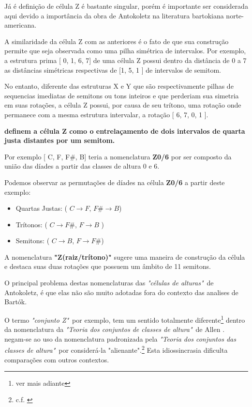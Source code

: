 \documentclass[
	12pt,				%
	openright,			%
	twoside,			%
	a4paper,			%
	english,			%
	french,				%
	spanish,			%
	brazil				%
	]{abntex2}
\begin{document}
Já é definição de célula Z é bastante singular, porém é importante ser considerada aqui devido a importância da obra de Antokoletz na literatura bartokiana norte-americana. 

A similaridade da célula Z com as anteriores é o fato de que sua construção permite que seja observada como uma pilha simétrica de intervalos. Por exemplo, a estrutura prima [ 0, 1, 6, 7] de uma célula Z possui dentro da distância de 0 a 7 as distâncias simétricas respectivas de [1, 5, 1 ] de intervalos de semitom. 

No entanto, diferente das estruturas X e Y que são respectivamente pilhas de sequencias imediatas de semitons ou tons inteiros e que perderiam sua simetria em suas rotações, a célula Z possui, por causa de seu trítono, uma rotação onde permanece com a mesma estrutura intervalar, a rotação [ 6, 7, 0, 1 ]. 

 \textbf{definem a célula Z como o entrelaçamento de dois intervalos de quarta justa distantes por um semitom.} 

Por exemplo [ C, F, F\#, B] teria a nomenclatura \textbf{Z0/6} por ser composto da união das díades a partir das classes de altura 0 e 6. 

Podemos observar as permutações de díades na célula \textbf{Z0/6} a partir deste exemplo:

\begin{itemize}
\item Quartas Justas: ( $C \rightarrow F$, $F\# \rightarrow B$) 

\item Trítonos: ( $C \rightarrow F\#$, $F \rightarrow B$ )

\item Semitons: ( $C \rightarrow B$, $F \rightarrow F\#$)
\end{itemize}


A nomenclatura \textbf{"Z(raiz/trítono)"} sugere uma maneira de construção da célula e destaca suas duas rotações que possuem um âmbito de 11 semitons. 

O principal problema destas nomenclaturas das \textit{"células de alturas"}\ de Antokoletz, é que elas não são muito adotadas fora do contexto das analises de Bartók.

O termo \textit{"conjunto Z"}\, por exemplo, tem um sentido totalmente diferente\footnote{ver mais adiante} dentro da nomenclatura da  \textit{"Teoria dos conjuntos de classes de altura"}\ de Allen .  negam-se ao uso da nomenclatura padronizada pela \textit{"Teoria dos conjuntos das classes de altura"}\ por considerá-la "alienante".\footnote{c.f. \cite[ p.xiii]{susanni_antokoletz2012music}} Esta idiossincrasia dificulta comparações com outros contextos.
\end{document}
